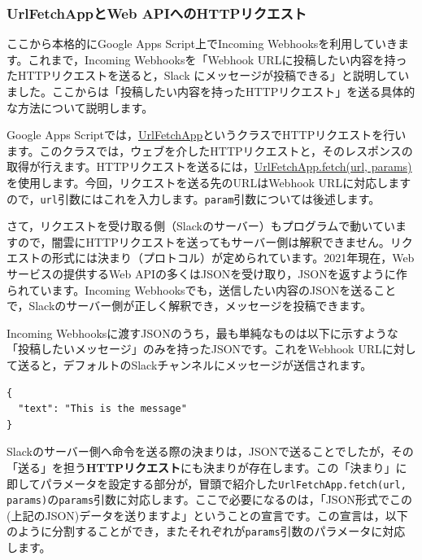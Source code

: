 \documentclass[uplatex,a4j]{jsarticle}
\begin{document}
\subsubsection{UrlFetchAppとWeb APIへのHTTPリクエスト}


ここから本格的にGoogle Apps Script上でIncoming Webhooksを利用していきます。これまで，Incoming Webhooksを「Webhook URLに投稿したい内容を持ったHTTPリクエストを送ると，Slack にメッセージが投稿できる」と説明していました。ここからは「投稿したい内容を持ったHTTPリクエスト」を送る具体的な方法について説明します。

Google Apps Scriptでは，\href{https://developers.google.com/apps-script/reference/url-fetch/url-fetch-app}{UrlFetchApp}というクラスでHTTPリクエストを行います。このクラスでは，ウェブを介したHTTPリクエストと，そのレスポンスの取得が行えます。HTTPリクエストを送るには，\href{https://developers.google.com/apps-script/reference/url-fetch/url-fetch-app#fetchurl,-params}{UrlFetchApp.fetch(url, params)}を使用します。今回，リクエストを送る先のURLはWebhook URLに対応しますので，\verb|url|引数にはこれを入力します。\verb|param|引数については後述します。


さて，リクエストを受け取る側（Slackのサーバー）もプログラムで動いていますので，闇雲にHTTPリクエストを送ってもサーバー側は解釈できません。リクエストの形式には決まり（プロトコル）が定められています。2021年現在，Webサービスの提供するWeb APIの多くはJSONを受け取り，JSONを返すように作られています。Incoming Webhooksでも，送信したい内容のJSONを送ることで，Slackのサーバー側が正しく解釈でき，メッセージを投稿できます。


Incoming Webhooksに渡すJSONのうち，最も単純なものは以下に示すような「投稿したいメッセージ」のみを持ったJSONです。これをWebhook URLに対して送ると，デフォルトのSlackチャンネルにメッセージが送信されます。
\begin{lstlisting}[basicstyle=\ttfamily\footnotesize,frame=single,caption=Minimum JSON payload for Incomming Webhooks,label=jsonpayload]
{
  "text": "This is the message"
}
\end{lstlisting}

Slackのサーバー側へ命令を送る際の決まりは，JSONで送ることでしたが，その「送る」を担う\textbf{HTTPリクエスト}にも決まりが存在します。この「決まり」に即してパラメータを設定する部分が，冒頭で紹介した\verb|UrlFetchApp.fetch(url, params)|の\verb|params|引数に対応します。ここで必要になるのは，「JSON形式でこの(上記のJSON)データを送りますよ」ということの宣言です。この宣言は，以下のように分割することができ，またそれぞれが\verb|params|引数のパラメータに対応します。
\end{document}
